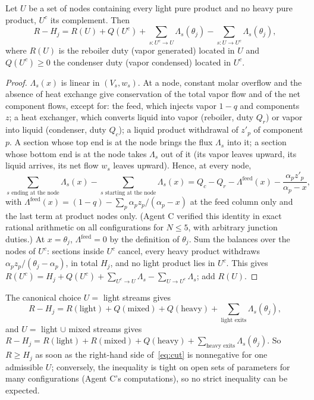 \documentclass[11pt,a4paper]{report}
\newcommand{\Lam}{\Lambda}
\begin{document}
\begin{proposition}\label{prop:cut}
Let $U$ be a set of nodes containing every light pure product and no heavy pure product, $U^c$ its complement. Then
\begin{equation}\label{eq:cut}
R-H_j=R(U)+Q(U^c)+\sum_{s\colon U^c\to U}\Lam_s(\theta_j)-\sum_{s\colon U\to U^c}\Lam_s(\theta_j),
\end{equation}
where $R(U)$ is the reboiler duty (vapor generated) located in $U$ and $Q(U^c)\ge0$ the condenser duty (vapor
condensed) located in $U^c$.
\end{proposition}
\begin{proof}
$\Lam_s(x)$ is linear in $(V_s,w_s)$. At a node, constant molar overflow and the absence of heat exchange give
conservation of the total vapor flow and of the net component flows, except for: the feed, which injects vapor $1-q$
and components $z$; a heat exchanger, which converts liquid into vapor (reboiler, duty $Q_r$) or vapor into liquid
(condenser, duty $Q_c$); a liquid product withdrawal of $z'_p$ of component $p$. A section whose top end is at the
node brings the flux $\Lam_s$ into it; a section whose bottom end is at the node takes $\Lam_s$ out of it (its vapor
leaves upward, its liquid arrives, its net flow $w_s$ leaves upward). Hence, at every node,
\[\sum_{s\text{ ending at the node}}\Lam_s(x)-\sum_{s\text{ starting at the node}}\Lam_s(x)
=Q_c-Q_r-\Lam^{\mathrm{feed}}(x)-\frac{\alpha_pz'_p}{\alpha_p-x},\]
with $\Lam^{\mathrm{feed}}(x)=(1-q)-\sum_p\alpha_pz_p/(\alpha_p-x)$ at the feed column only and the last term at product
nodes only. (Agent C verified this identity in exact rational arithmetic on all configurations for $N\le5$, with
arbitrary junction duties.) At $x=\theta_j$, $\Lam^{\mathrm{feed}}=0$ by the
definition of $\theta_j$. Sum the balances over the nodes of $U^c$: sections inside $U^c$ cancel, every heavy product
withdraws $\alpha_pz_p/(\theta_j-\alpha_p)$, in total $H_j$, and no light product lies in $U^c$. This gives
$R(U^c)=H_j+Q(U^c)+\sum_{U^c\to U}\Lam_s-\sum_{U\to U^c}\Lam_s$; add $R(U)$.
\end{proof}

The canonical choice $U=$ light streams gives
\begin{equation}\label{eq:lightcut}
R-H_j=R(\text{light})+Q(\text{mixed})+Q(\text{heavy})+\sum_{\text{light exits}}\Lam_s(\theta_j),
\end{equation}
and $U=$ light $\cup$ mixed streams gives
$R-H_j=R(\text{light})+R(\text{mixed})+Q(\text{heavy})+\sum_{\text{heavy exits}}\Lam_s(\theta_j)$.
So $R\ge H_j$ as soon as the right-hand side of~\eqref{eq:cut} is nonnegative for one admissible $U$; conversely, the
inequality is tight on open sets of parameters for many configurations (Agent C's computations), so no strict
inequality can be expected.
\end{document}
